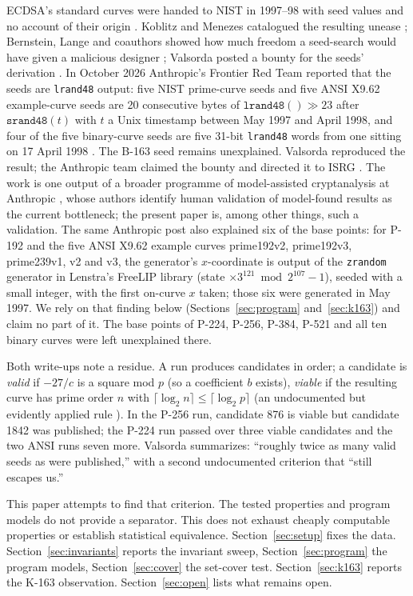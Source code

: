 \documentclass[11pt]{article}
\newcommand{\lrand}{\texttt{lrand48}}
\begin{document}
ECDSA's standard curves were handed to NIST in 1997--98 with seed values and no account of their origin \cite{fips186-2,x962}. Koblitz and Menezes catalogued the resulting unease \cite{riddle}; Bernstein, Lange and coauthors showed how much freedom a seed-search would have given a malicious designer \cite{bada55}; Valsorda posted a bounty for the seeds' derivation \cite{bounty}. In October 2026 Anthropic's Frontier Red Team reported that the seeds are \lrand{} output: five NIST prime-curve seeds and five ANSI X9.62 example-curve seeds are 20 consecutive bytes of $\lrand() \gg 23$ after $\texttt{srand48}(t)$ with $t$ a Unix timestamp between May 1997 and April 1998, and four of the five binary-curve seeds are five 31-bit \lrand{} words from one sitting on 17 April 1998 \cite{anthropic}. The B-163 seed remains unexplained. Valsorda reproduced the result; the Anthropic team claimed the bounty and directed it to ISRG \cite{seeds-solved}. The work is one output of a broader programme of model-assisted cryptanalysis at Anthropic \cite{anthropic-crypto}, whose authors identify human validation of model-found results as the current bottleneck; the present paper is, among other things, such a validation. The same Anthropic post \cite{anthropic} also explained six of the base points: for P-192 and the five ANSI X9.62 example curves prime192v2, prime192v3, prime239v1, v2 and v3, the generator's $x$-coordinate is output of the \texttt{zrandom} generator in Lenstra's FreeLIP library \cite{freelip} (state $\times 3^{121} \bmod 2^{107}-1$), seeded with a small integer, with the first on-curve $x$ taken; those six were generated in May 1997. We rely on that finding below (Sections~\ref{sec:program} and~\ref{sec:k163}) and claim no part of it. The base points of P-224, P-256, P-384, P-521 and all ten binary curves were left unexplained there.

Both write-ups note a residue. A run produces candidates in order; a candidate is \emph{valid} if $-27/c$ is a square mod $p$ (so a coefficient $b$ exists), \emph{viable} if the resulting curve has prime order $n$ with $\lceil\log_2 n\rceil \le \lceil\log_2 p\rceil$ (an undocumented but evidently applied rule \cite{seeds-solved}). In the P-256 run, candidate 876 is viable but candidate 1842 was published; the P-224 run passed over three viable candidates and the two ANSI runs seven more. Valsorda summarizes: ``roughly twice as many valid seeds as were published,'' with a second undocumented criterion that ``still escapes us.''

This paper attempts to find that criterion. The tested properties and program models do not provide a separator. This does not exhaust cheaply computable properties or establish statistical equivalence. Section~\ref{sec:setup} fixes the data. Section~\ref{sec:invariants} reports the invariant sweep, Section~\ref{sec:program} the program models, Section~\ref{sec:cover} the set-cover test. Section~\ref{sec:k163} reports the K-163 observation. Section~\ref{sec:open} lists what remains open.
\end{document}
